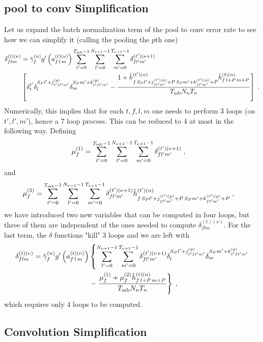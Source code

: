 \begin{subappendices}
\subsection{pool to conv Simplification}

Let us expand the batch normalization term of the pool to conv error rate to see how we can simplify it (calling the pooling the $p$th one)
\begin{align}
\delta^{(t)(\nu)}_{flm}&=\tilde{\gamma}^{(n)}_fg'\left(a_{f\,l\,m}^{(t)(\nu)}\right)
%
\sum_{t'=0}^{T_{{\rm mb}}-1}\sum^{N_{\nu+1}-1}_{l'=0}\sum^{T_{\nu+1}-1}_{m'=0}\delta_{fl'm'}^{(t')(\nu+1)}\notag\\
%
&\left[\delta^{t'}_t\delta^{S_P l'+j_{t'fl'm'}^{(p)}}_l\delta^{S_Pm'+k_{t'fl'm'}^{(p)}}_m-
%
\frac{1+\tilde{h}_{f\,S_P l'+j_{fl'm'}^{(t')(p)}+P\,S_Pm'+k_{fl'm'}^{(t')(p)}+P}^{(t')(n)}\tilde{h}_{f\,l+P\,m+P}^{(t)(n)}}{T_{{\rm mb}}N_nT_n}\right]\;.
\end{align}
Numerically, this implies that for each $t,f,l,m$ one needs to perform 3 loops (on $t',l',m'$), hence a 7 loop process. This can be reduced to 4 at most in the following way. Defining
\begin{align}
\mu_f^{(1)}&=
%
\sum_{t'=0}^{T_{{\rm mb}}-1}\sum^{N_{\nu+1}-1}_{l'=0}\sum^{T_{\nu+1}-1}_{m'=0}
%
\delta_{fl'm'}^{(t')(\nu+1)}\;,
\end{align}
and
\begin{align}
\mu_f^{(2)}&=
%
\sum_{t'=0}^{T_{{\rm mb}}-1}\sum^{N_{\nu+1}-1}_{l'=0}\sum^{T_{\nu+1}-1}_{m'=0}\delta_{fl'm'}^{(t')(\nu+1)}
%
\tilde{h}_{f\,S_P l'+j_{fl'm'}^{(t')(p)}+P\,S_Pm'+k_{fl'm'}^{(t')(p)}+P}^{(t')(n)}\;,
\end{align}
we have introduced two new variables that can be computed in four loops, but three of them are independent of the ones needed to compute $\delta^{(t)(\nu)}_{flm}$. For the last term, the $\delta$ functions "kill" 3 loops and we are left with
\begin{align}
\delta^{(t)(\nu)}_{flm}=\tilde{\gamma}^{(n)}_fg'\left(a_{f\,l\,m}^{(t)(\nu)}\right)&\left\{
%
\sum^{N_{\nu+1}-1}_{l'=0}\sum^{T_{\nu+1}-1}_{m'=0}\delta_{fl'm'}^{(t')(\nu+1)}
%
\delta^{S_P l'+j_{t'fl'm'}^{(p)}}_l\delta^{S_Pm'+k_{t'fl'm'}^{(p)}}_m\right.\notag\\
%
&-\left.
%
\frac{\mu_f^{(1)}+\mu_f^{(2)}\tilde{h}_{f\,l+P\,m+P}^{(t)(n)}}{T_{{\rm mb}}N_nT_n}\right\}\;,
\end{align}
which requires only 4 loops to be computed.

\subsection{Convolution Simplification}


\end{subappendices}

